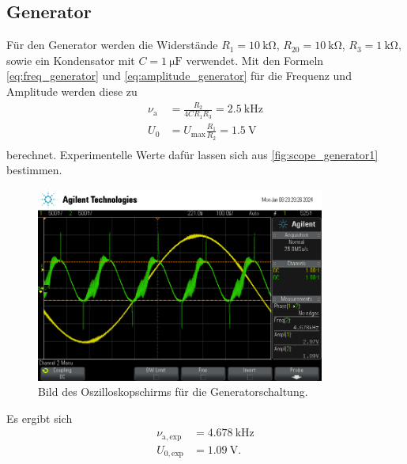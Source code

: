 \subsection{Generator}
Für den Generator werden die Widerstände $R_1=\qty{10}{\kilo\ohm}$, $R_20=\qty{10}{\kilo\ohm}$, $R_3=\qty{1}{\kilo\ohm}$, sowie ein Kondensator mit $C=\qty{1}{\micro\farad}$ verwendet.
Mit den Formeln \eqref{eq:freq_generator} und \eqref{eq:amplitude_generator} für die Frequenz und Amplitude werden diese zu
\begin{align*}
  \nu_\text{a} &= \frac{R_2}{4C R_1 R_3} =\qty{2,5}{\kilo\hertz} \\
  U_0 &= U_\text{max} \frac{R_1}{R_2} =\qty{1,5}{\volt} \\
\end{align*}
berechnet. Experimentelle Werte dafür lassen sich aus \autoref{fig:scope_generator1} bestimmen.
\begin{figure}
  \centering
  \includegraphics[height=6.4cm]{content/scope/scope_16.png}
  \caption{Bild des Oszilloskopschirms für die Generatorschaltung.}
  \label{fig:scope_generator1}
\end{figure}
Es ergibt sich
\begin{align*}
  \nu_{\mathrm{a, exp}} &= \qty{4,678}{\kilo\hertz} \\
  U_{0, \mathrm{exp}} &= \qty{1,09}{\volt}.
\end{align*}

